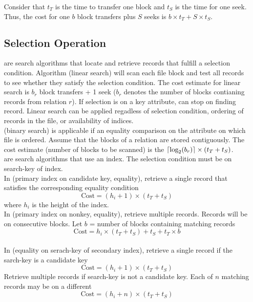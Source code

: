 \documentclass{article}
\begin{document}
Consider that $t_T$ is the time to transfer one block and $t_S$ is the time for one seek. Thus, the cost for one $b$ block transfers plus $S$ seeks is $b \times t_T + S \times t_S$. 

\subsection{Selection Operation}

 are search algorithms that locate and retrieve records that fulfill a selection condition. Algorithm  (linear search) will scan each file block and test all records to see whether they satisfy the selection condition. The cost estimate for linear search is $b_r$ block transfers + 1 seek ($b_r$ denotes the number of blocks contianing records from relation $r$). If selection is on a key attribute, can stop on finding record. Linear search can be applied regadless of selection condition, ordering of records in the file, or availability of indices. \\ 

 (binary search) is applicable if an equality comparison on the attribute on which file is ordered. Assume that the blocks of a relation are stored contiguously. The cost estimate (number of blocks to be scanned) is the $\left\lceil \textrm{log}_2 (b_r) \right\rceil \times (t_T + t_S)$. \\ 

 are search algorithms that use an index. The selection condition must be on search-key of index.\\

In  (primary index on candidate key, equality), retrieve a single record that satisfies the corresponding equality condition $$\textrm{Cost} = (h_i + 1) \times (t_T + t_S)$$ where $h_i$ is the height of the index. \\ 

In  (primary index on nonkey, equality), retrieve multiple records. Records will be on consecutive blocks. Let $b$ = number of blocks containing matching records $$\textrm{Cost} = h_i \times (t_T + t_S) + t_S + t_T \times b$$ \\ 

In  (equality on serach-key of secondary index), retrieve a single record if the sarch-key is a candidate key $$\textrm{Cost} = (h_i + 1) \times (t_T + t_S)$$ Retrieve multiple records if search-key is not a candidate key. Each of $n$ matching records may be on a different $$\textrm{Cost} = (h_i + n) \times (t_T + t_S)$$ \\ 
\end{document}
